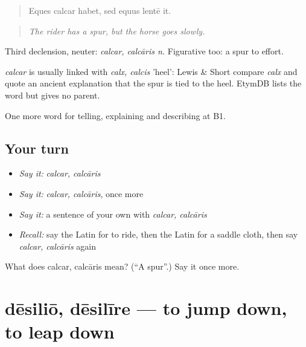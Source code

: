 \begin{quote}
Eques calcar habet, sed equus lentē it.
\end{quote}

\begin{quote}
\emph{The rider has a spur, but the horse goes slowly.}
\end{quote}

Third declension, neuter: \emph{calcar, calcāris n.} Figurative too: a spur to effort.

\begin{cousinweb}
\emph{calcar} is usually linked with \emph{calx, calcis} 'heel': Lewis \& Short compare \emph{calx} and quote an ancient explanation that the spur is tied to the heel. EtymDB lists the word but gives no parent.
\end{cousinweb}

\begin{grammarlens}[title={What you've built}]
One more word for telling, explaining and describing at B1.
\end{grammarlens}

\subsection*{Your turn}
\begin{itemize}
\raggedright
  \item \emph{Say it:} \emph{calcar, calcāris}
  \item \emph{Say it:} \emph{calcar, calcāris}, once more
  \item \emph{Say it:} a sentence of your own with \emph{calcar, calcāris}
  \item \emph{Recall:} say the Latin for to ride, then the Latin for a saddle cloth, then say \emph{calcar, calcāris} again
\end{itemize}

\begin{tcolorbox}[breakable,colback=teal!4,colframe=teal!35!black,title={Before you move on}]
What does calcar, calcāris mean? (\textquotedblleft{}A spur\textquotedblright{}.) Say it once more.
\end{tcolorbox}
\section[dēsiliō, dēsilīre]{dēsiliō, dēsilīre — to jump down, to leap down}

\label{lesson:LA-C432-desilio}



